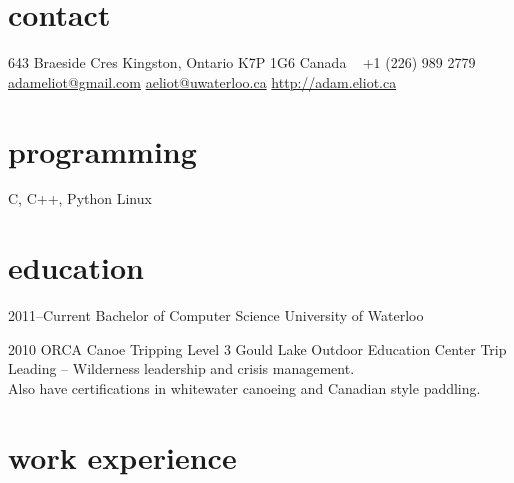\documentclass[]{friggeri-cv} %
\begin{document}


\begin{aside} %
\section{contact}
643 Braeside Cres
Kingston, Ontario 
K7P 1G6
Canada
~
+1 (226) 989 2779
~
\href{mailto:adameliot@gmail.com}{adameliot@gmail.com}
\href{mailto:aeliot@uwaterloo.ca}{aeliot@uwaterloo.ca}
\href{http://adam.eliot.ca}{http://adam.eliot.ca}
\section{programming}
C, C++, Python
Linux
\end{aside}


\section{education}

\begin{entrylist}
\entry
{2011--Current}
{Bachelor {\normalfont of Computer Science}}
{University of Waterloo}
{}

\entry
{2010}
{ORCA {\normalfont Canoe Tripping Level 3}}
{Gould Lake Outdoor Education Center}
{Trip Leading -- Wilderness leadership and crisis management. \\
Also have certifications in whitewater canoeing and Canadian style paddling.}

\end{entrylist}


\section{work experience}
\end{document}
